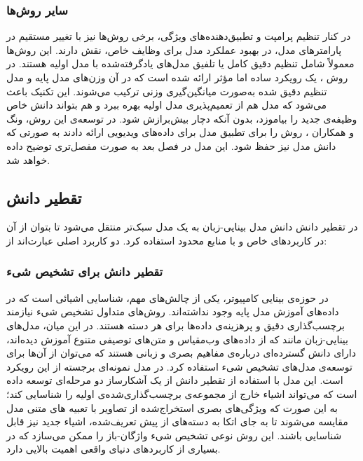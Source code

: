 \subsubsection{سایر روش‌ها}
در کنار تنظیم پرامپت و تطبیق‌دهنده‌های ویژگی، برخی روش‌ها نیز با تغییر مستقیم در پارامترهای مدل، در بهبود عملکرد مدل برای وظایف خاص، نقش دارند. این روش‌ها معمولاً شامل تنظیم دقیق کامل یا تلفیق مدل‌های یادگرفته‌شده با مدل اولیه هستند. در روش
\cite{Wise-FT}
، یک رویکرد ساده اما مؤثر ارائه شده است که در آن وزن‌های مدل پایه و مدل تنظیم دقیق شده  به‌صورت میانگین‌گیری وزنی ترکیب می‌شوند. این تکنیک باعث می‌شود که مدل هم از تعمیم‌پذیری مدل اولیه بهره ببرد و هم بتواند دانش خاص وظیفه‌ی جدید را بیاموزد، بدون آنکه دچار بیش‌برازش شود. در توسعه‌ی این روش، ونگ و همکاران
\cite{open-vclip}،
روش 
را برای تطبیق مدل  برای داده‌های ویدیویی ارائه دادند به صورتی که دانش مدل  نیز حفظ شود. این مدل در فصل بعد به صورت مفصل‌تری توضیح داده خواهد شد. 
\subsection{تقطیر دانش}
در تقطیر دانش
دانش مدل بینایی-زبان به یک مدل سبک‌تر منتقل می‌شود تا بتوان از آن در کاربردهای خاص و با منابع محدود استفاده کرد. دو کاربرد اصلی عبارت‌اند از:
\subsubsection{تقطیر دانش برای تشخیص شیء}
در حوزه‌ی بینایی کامپیوتر، یکی از چالش‌های مهم، شناسایی اشیائی است که در داده‌های آموزش مدل پایه وجود نداشته‌اند. روش‌های متداول تشخیص شیء نیازمند برچسب‌گذاری دقیق و پرهزینه‌ی داده‌ها برای هر دسته هستند. در این میان، مدل‌های بینایی-زبان مانند
 که از داده‌های وب‌مقیاس و متن‌های توصیفی متنوع آموزش دیده‌اند، دارای دانش گسترده‌ای درباره‌ی مفاهیم بصری و زبانی هستند که می‌توان از آن‌ها برای توسعه‌ی مدل‌های تشخیص شیء استفاده کرد. در مدل 
 \cite{ViLD}
نمونه‌ای برجسته از این رویکرد است. این مدل با استفاده از تقطیر دانش از 
یک آشکارساز دو مرحله‌ای توسعه داده است که می‌تواند اشیاء خارج از مجموعه‌ی برچسب‌گذاری‌شده‌ی اولیه را شناسایی کند؛ به این صورت که ویژگی‌های بصری استخراج‌شده از تصاویر با تعبیه های متنی مدل
مقایسه می‌شوند تا به جای اتکا به دسته‌های از پیش تعریف‌شده، اشیاء جدید نیز قابل شناسایی باشند. این روش نوعی تشخیص شیء واژگان-باز  را ممکن می‌سازد که در بسیاری از کاربردهای دنیای واقعی اهمیت بالایی دارد.
